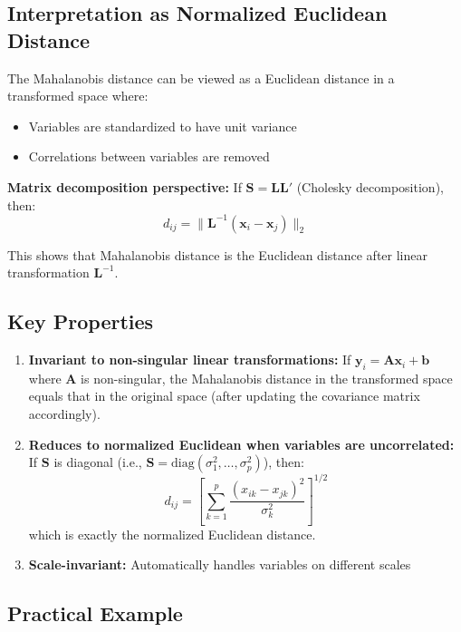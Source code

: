 \documentclass[11pt]{article}
\begin{document}
\subsection{Interpretation as Normalized Euclidean Distance}

The Mahalanobis distance can be viewed as a Euclidean distance in a transformed space where:
\begin{itemize}
    \item Variables are standardized to have unit variance
    \item Correlations between variables are removed
\end{itemize}

\textbf{Matrix decomposition perspective:} If $\mathbf{S} = \mathbf{LL}'$ (Cholesky decomposition), then:
$$d_{ij} = \|\mathbf{L}^{-1}(\mathbf{x}_i - \mathbf{x}_j)\|_2$$

This shows that Mahalanobis distance is the Euclidean distance after linear transformation $\mathbf{L}^{-1}$.

\subsection{Key Properties}

\begin{enumerate}
    \item \textbf{Invariant to non-singular linear transformations:} 
    If $\mathbf{y}_i = \mathbf{A}\mathbf{x}_i + \mathbf{b}$ where $\mathbf{A}$ is non-singular, the Mahalanobis distance in the transformed space equals that in the original space (after updating the covariance matrix accordingly).
    
    \item \textbf{Reduces to normalized Euclidean when variables are uncorrelated:}
    If $\mathbf{S}$ is diagonal (i.e., $\mathbf{S} = \text{diag}(\sigma_1^2, \ldots, \sigma_p^2)$), then:
    $$d_{ij} = \left[\sum_{k=1}^{p} \frac{(x_{ik} - x_{jk})^2}{\sigma_k^2}\right]^{1/2}$$
    which is exactly the normalized Euclidean distance.
    
    \item \textbf{Scale-invariant:} Automatically handles variables on different scales
\end{enumerate}

\subsection{Practical Example}
\end{document}
